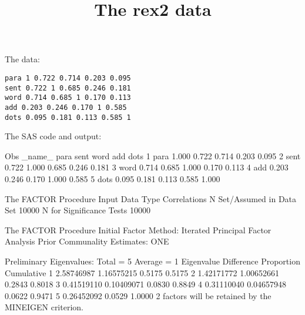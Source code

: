 \documentclass{article}
\title{The rex2 data}
\begin{document}
\maketitle
The data:
\begin{verbatim}
para 1 0.722 0.714 0.203 0.095
sent 0.722 1 0.685 0.246 0.181
word 0.714 0.685 1 0.170 0.113
add 0.203 0.246 0.170 1 0.585
dots 0.095 0.181 0.113 0.585 1
\end{verbatim}
The SAS code and output:
\begin{Woutput}
Obs    _name_     para     sent     word     add      dots
 1      para     1.000    0.722    0.714    0.203    0.095
 2      sent     0.722    1.000    0.685    0.246    0.181
 3      word     0.714    0.685    1.000    0.170    0.113
 4      add      0.203    0.246    0.170    1.000    0.585
 5      dots     0.095    0.181    0.113    0.585    1.000

The FACTOR Procedure
Input Data Type                Correlations
N Set/Assumed in Data Set             10000
N for Significance Tests              10000

The FACTOR Procedure
Initial Factor Method: Iterated Principal Factor Analysis
Prior Communality Estimates: ONE

       Preliminary Eigenvalues: Total = 5  Average = 1
        Eigenvalue    Difference    Proportion    Cumulative
   1    2.58746987    1.16575215        0.5175        0.5175
   2    1.42171772    1.00652661        0.2843        0.8018
   3    0.41519110    0.10409071        0.0830        0.8849
   4    0.31110040    0.04657948        0.0622        0.9471
   5    0.26452092                      0.0529        1.0000
2 factors will be retained by the MINEIGEN criterion.

\end{Woutput}
\newpage
\end{document}
